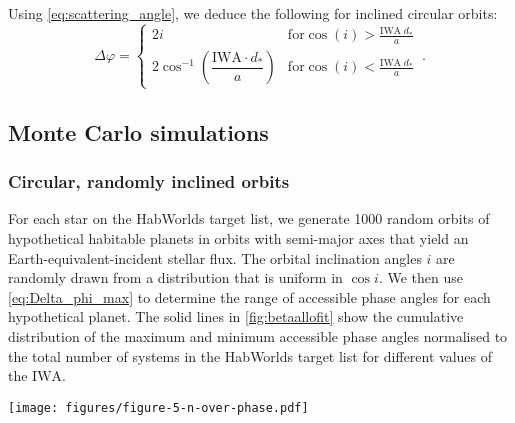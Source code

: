 \documentclass[usenatbib]{mnras}
\newcommand{\IWA}{\ensuremath{\mathrm{IWA}}\xspace}
\newcommand{\HWO}{HabWorlds\xspace}
\begin{document}
Using \cref{eq:scattering_angle}, we deduce the following for inclined circular orbits: 
\begin{equation}
\label{eq:Delta_phi_max}
    \Delta \varphi = 
    \begin{cases}
        2 i & \textrm{for} \cos(i) > \frac{\mathrm{IWA}\; d_* }{a} \\ 
        2 \cos^{-1}\left(\dfrac{\mathrm{IWA}\cdot d_* }{a}\right) & \textrm{for} \cos(i) < \frac{\mathrm{IWA}\; d_* }{a}
    \end{cases} \,.
\end{equation}





\subsection{Monte Carlo simulations}
\label{subsec:2.3}

\subsubsection{Circular, randomly inclined orbits}
\label{sec:circular}

For each star on the \HWO target list, we generate \num{1000} random orbits of hypothetical habitable planets in orbits with semi-major axes that yield an Earth-equivalent-incident stellar flux. 
The orbital inclination angles $i$ are randomly drawn from a distribution that is uniform in $\cos i$. 
We then use \cref{eq:Delta_phi_max} to determine the range of accessible phase angles for each hypothetical planet.
The solid lines in \cref{fig:betaallofit} show the cumulative distribution of the maximum and minimum accessible phase angles normalised to the total number of systems in the \HWO target list for different values of the \IWA.



\begin{figure*}%
    \centering
    \texttt{[image: figures/figure-5-n-over-phase.pdf]}
    \caption{
        Cumulative distributions of the most extreme phase angles accessible for different \IWA and for randomly inclined, circular orbits (solid lines) and randomly inclined, elliptical orbits (dashed lines).
        The top $x$-axis indicates the minimum and the bottom $x$-axis the maximum accessible phase angle.
        These angles are symmetric about quadrature (90 degrees).
        The $y$-axis on the left indicates the number of planetary systems divided by the number of Monte Carlo samples, and is thus normalised to the number of systems on the target list.
        The $y$-axis on the right indicates the number of systems, assuming $\eta_\oplus = \qty{24}{\percent}$ of them have an Earth-like planet in their HZ.
    }
    \label{fig:betaallofit}
\end{figure*}
\end{document}
